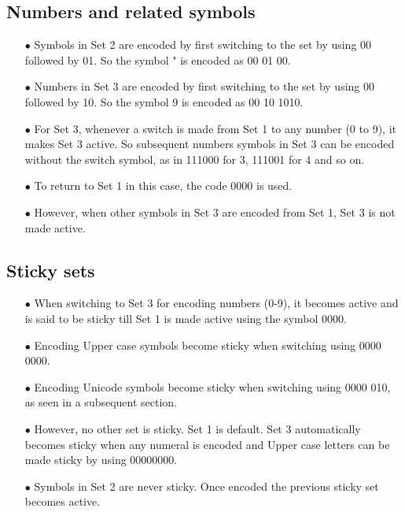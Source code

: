 \documentclass[]{article}
\begin{document}
\subsection{Numbers and related symbols}
\begin{itemize}
	\item[$\bullet$] Symbols in Set 2 are encoded by first switching to the set by using 00 followed by 01. So the symbol " is encoded as 00 01 00.
	\item[$\bullet$] Numbers in Set 3 are encoded by first switching to the set by using 00 followed by 10. So the symbol 9 is encoded as 00 10 1010.
	\item[$\bullet$] For Set 3, whenever a switch is made from Set 1 to any number (0 to 9), it makes Set 3 active. So subsequent numbers symbols in Set 3 can be encoded without the switch symbol, as in 111000 for 3, 111001 for 4 and so on.
	\item[$\bullet$] To return to Set 1 in this case, the code 0000 is used.
	\item[$\bullet$] However, when other symbols in Set 3 are encoded from Set 1, Set 3 is not made active.
\end{itemize}

\subsection{Sticky sets}
\begin{itemize}
	\item[$\bullet$] When switching to Set 3 for encoding numbers (0-9), it becomes active and is said to be sticky till Set 1 is made active using the symbol 0000.
	\item[$\bullet$] Encoding Upper case symbols become sticky when switching using 0000 0000.
	\item[$\bullet$] Encoding Unicode symbols become sticky when switching using 0000 010, as seen in a subsequent section.
	\item[$\bullet$] However, no other set is sticky. Set 1 is default. Set 3 automatically becomes sticky when any numeral is encoded and Upper case letters can be made sticky by using 00000000.
	\item[$\bullet$] Symbols in Set 2 are never sticky. Once encoded the previous sticky set becomes active.
\end{itemize}
\end{document}
